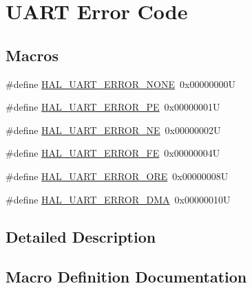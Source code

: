 \hypertarget{group___u_a_r_t___error___code}{}\section{U\+A\+RT Error Code}
\label{group___u_a_r_t___error___code}
\subsection*{Macros}
\begin{DoxyCompactItemize}
\item 
\#define \hyperlink{group___u_a_r_t___error___code_ga275de35cb518c19c284764f3ecb1aac5}{H\+A\+L\+\_\+\+U\+A\+R\+T\+\_\+\+E\+R\+R\+O\+R\+\_\+\+N\+O\+NE}~0x00000000U
\item 
\#define \hyperlink{group___u_a_r_t___error___code_gad447a37701acd199dcb653ce32917970}{H\+A\+L\+\_\+\+U\+A\+R\+T\+\_\+\+E\+R\+R\+O\+R\+\_\+\+PE}~0x00000001U
\item 
\#define \hyperlink{group___u_a_r_t___error___code_ga4a4e32a346dd01f4c41c4fc27afbc72c}{H\+A\+L\+\_\+\+U\+A\+R\+T\+\_\+\+E\+R\+R\+O\+R\+\_\+\+NE}~0x00000002U
\item 
\#define \hyperlink{group___u_a_r_t___error___code_gaf23cb510d4dc2c8e05a45abfbf5f3457}{H\+A\+L\+\_\+\+U\+A\+R\+T\+\_\+\+E\+R\+R\+O\+R\+\_\+\+FE}~0x00000004U
\item 
\#define \hyperlink{group___u_a_r_t___error___code_gaedc030add6c499cf41be7f12dd95930c}{H\+A\+L\+\_\+\+U\+A\+R\+T\+\_\+\+E\+R\+R\+O\+R\+\_\+\+O\+RE}~0x00000008U
\item 
\#define \hyperlink{group___u_a_r_t___error___code_gac1d608ae3499a449cd6cd102e7f86605}{H\+A\+L\+\_\+\+U\+A\+R\+T\+\_\+\+E\+R\+R\+O\+R\+\_\+\+D\+MA}~0x00000010U
\end{DoxyCompactItemize}


\subsection{Detailed Description}


\subsection{Macro Definition Documentation}
\mbox{\label{group___u_a_r_t___error___code_gac1d608ae3499a449cd6cd102e7f86605}} 
